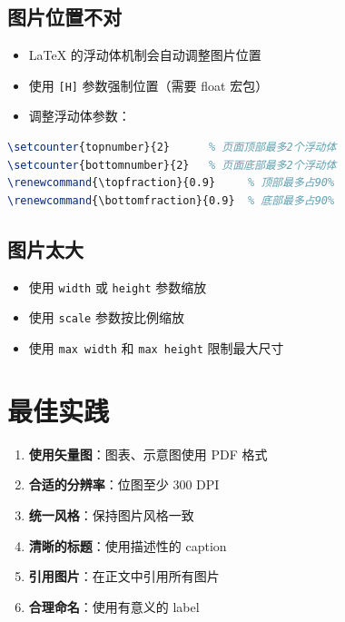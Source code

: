 \subsection{图片位置不对}

\begin{itemize}
  \item LaTeX 的浮动体机制会自动调整图片位置
  \item 使用 \texttt{[H]} 参数强制位置（需要 float 宏包）
  \item 调整浮动体参数：
\end{itemize}

\begin{lstlisting}[language=TeX]
\setcounter{topnumber}{2}      % 页面顶部最多2个浮动体
\setcounter{bottomnumber}{2}   % 页面底部最多2个浮动体
\renewcommand{\topfraction}{0.9}     % 顶部最多占90%
\renewcommand{\bottomfraction}{0.9}  % 底部最多占90%
\end{lstlisting}

\subsection{图片太大}

\begin{itemize}
  \item 使用 \texttt{width} 或 \texttt{height} 参数缩放
  \item 使用 \texttt{scale} 参数按比例缩放
  \item 使用 \texttt{max width} 和 \texttt{max height} 限制最大尺寸
\end{itemize}

\section{最佳实践}

\begin{enumerate}
  \item \textbf{使用矢量图}：图表、示意图使用 PDF 格式
  \item \textbf{合适的分辨率}：位图至少 300 DPI
  \item \textbf{统一风格}：保持图片风格一致
  \item \textbf{清晰的标题}：使用描述性的 caption
  \item \textbf{引用图片}：在正文中引用所有图片
  \item \textbf{合理命名}：使用有意义的 label
\end{enumerate}
